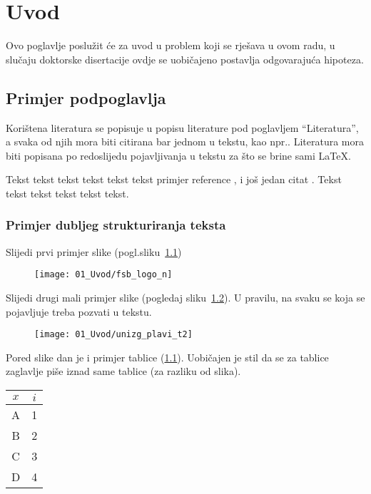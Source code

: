 \chapter{Uvod}

Ovo poglavlje poslužit će za uvod u problem koji se rješava u ovom
radu, u slučaju doktorske disertacije ovdje se uobičajeno postavlja odgovarajuća
hipoteza.

\section{Primjer podpoglavlja}
Korištena literatura se popisuje u popisu literature pod poglavljem
``Literatura'', a svaka od njih mora biti citirana bar jednom u tekstu, kao
npr.\cite{Siegwart2004}. Literatura mora biti popisana po redoslijedu
pojavljivanja u tekstu za što se brine sami \LaTeX. 

Tekst tekst tekst tekst tekst tekst primjer reference
, i jo\v{s} jedan citat \cite{cern_tim}.
Tekst tekst tekst tekst tekst tekst.

\subsection{Primjer dubljeg strukturiranja teksta}
Slijedi prvi primjer slike (pogl.sliku~\ref{fig1})
\begin{figure}[H]
  \centering
  \texttt{[image: 01\_Uvod/fsb\_logo\_n]}
  \label{fig1}
\end{figure}
%
%
Slijedi drugi mali primjer slike (pogledaj sliku~\ref{fig2}). U pravilu, na
svaku se koja se pojavljuje treba pozvati u tekstu.
\begin{figure}[H]
  \centering
  \texttt{[image: 01\_Uvod/unizg\_plavi\_t2]}\\
  \label{fig2}
\end{figure}

Pored slike dan je i primjer tablice (\ref{tablica}). Uobičajen je stil da se
za tablice zaglavlje piše iznad same tablice (za razliku od slika). 
\begin{table}[H]
\label{tablica}
  \centering
\begin{tabular}{|c|c|} \hline
    $x$ & $i$ \\\hline\hline
    A & 1 \\
    B & 2 \\
    C & 3 \\
    D & 4 \\ \hline
\end{tabular}
\end{table}

